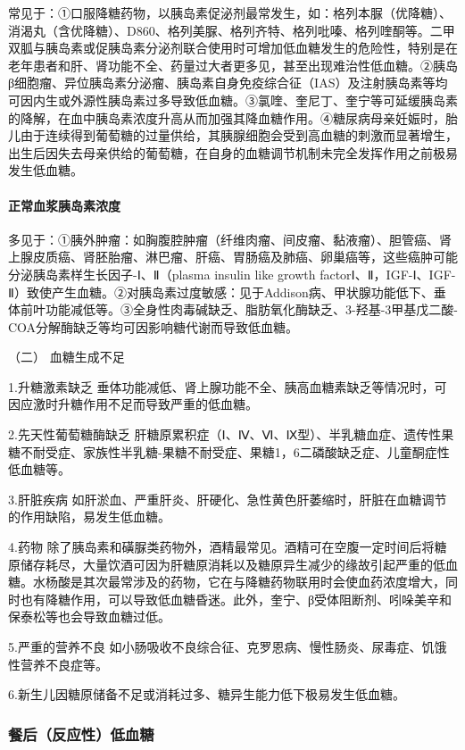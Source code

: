 常见于：①口服降糖药物，以胰岛素促泌剂最常发生，如：格列本脲（优降糖）、消渴丸（含优降糖）、D860、格列美脲、格列齐特、格列吡嗪、格列喹酮等。二甲双胍与胰岛素或促胰岛素分泌剂联合使用时可增加低血糖发生的危险性，特别是在老年患者和肝、肾功能不全、药量过大者更多见，甚至出现难治性低血糖。②胰岛β细胞瘤、异位胰岛素分泌瘤、胰岛素自身免疫综合征（IAS）及注射胰岛素等均可因内生或外源性胰岛素过多导致低血糖。③氯喹、奎尼丁、奎宁等可延缓胰岛素的降解，在血中胰岛素浓度升高从而加强其降血糖作用。④糖尿病母亲妊娠时，胎儿由于连续得到葡萄糖的过量供给，其胰腺细胞会受到高血糖的刺激而显著增生，出生后因失去母亲供给的葡萄糖，在自身的血糖调节机制未完全发挥作用之前极易发生低血糖。

\paragraph{正常血浆胰岛素浓度}

多见于：①胰外肿瘤：如胸腹腔肿瘤（纤维肉瘤、间皮瘤、黏液瘤）、胆管癌、肾上腺皮质癌、肾胚胎瘤、淋巴瘤、肝癌、胃肠癌及肺癌、卵巢癌等，这些癌肿可能分泌胰岛素样生长因子-Ⅰ、Ⅱ（plasma
insulin like growth
factorⅠ、Ⅱ，IGF-Ⅰ、IGF-Ⅱ）致使产生血糖。②对胰岛素过度敏感：见于Addison病、甲状腺功能低下、垂体前叶功能减低等。③全身性肉毒碱缺乏、脂肪氧化酶缺乏、3-羟基-3甲基戊二酸-COA分解酶缺乏等均可因影响糖代谢而导致低血糖。

\hypertarget{text00120.htmlux5cux23CHP4-13-1-1-2}{}
（二） 血糖生成不足

1.升糖激素缺乏
垂体功能减低、肾上腺功能不全、胰高血糖素缺乏等情况时，可因应激时升糖作用不足而导致严重的低血糖。

2.先天性葡萄糖酶缺乏
肝糖原累积症（Ⅰ、Ⅳ、Ⅵ、Ⅸ型）、半乳糖血症、遗传性果糖不耐受症、家族性半乳糖-果糖不耐受症、果糖1，6二磷酸缺乏症、儿童酮症性低血糖等。

3.肝脏疾病
如肝淤血、严重肝炎、肝硬化、急性黄色肝萎缩时，肝脏在血糖调节的作用缺陷，易发生低血糖。

4.药物
除了胰岛素和磺脲类药物外，酒精最常见。酒精可在空腹一定时间后将糖原储存耗尽，大量饮酒可因为肝糖原消耗以及糖原异生减少的缘故引起严重的低血糖。水杨酸是其次最常涉及的药物，它在与降糖药物联用时会使血药浓度增大，同时也有降糖作用，可以导致低血糖昏迷。此外，奎宁、β受体阻断剂、吲哚美辛和保泰松等也会导致血糖过低。

5.严重的营养不良
如小肠吸收不良综合征、克罗恩病、慢性肠炎、尿毒症、饥饿性营养不良症等。

6.新生儿因糖原储备不足或消耗过多、糖异生能力低下极易发生低血糖。

\subsubsection{餐后（反应性）低血糖}

